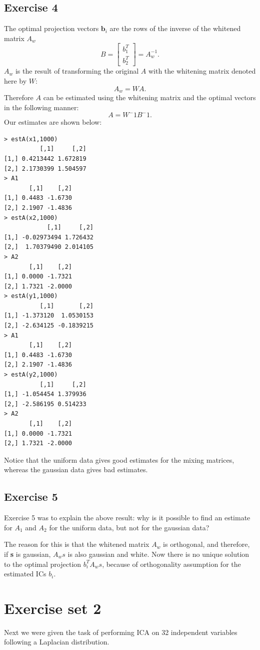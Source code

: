 \documentclass{article}
\begin{document}
\subsection{Exercise 4}
The optimal projection vectors $\textbf{b}_i$ are the rows of the inverse of the
whitened matrix $A_w$
\[
B = \left[ \begin{array}{ccc}
b_1^T  \\
b_2 ^T \end{array} \right] = A_w^{-1}.
\]
$A_w$ is the result of transforming the original $A$ with the
whitening matrix denoted here by $W$:
\[
A_w = WA.
\]
Therefore $A$ can be estimated using the whitening matrix and the optimal
vectors in the following manner:
\[
A = W^-1B^-1.
\]
Our estimates are shown below:
\begin{verbatim}
> estA(x1,1000)
          [,1]     [,2]
[1,] 0.4213442 1.672819
[2,] 2.1730399 1.504597
> A1
       [,1]    [,2]
[1,] 0.4483 -1.6730
[2,] 2.1907 -1.4836
> estA(x2,1000)
            [,1]     [,2]
[1,] -0.02973494 1.726432
[2,]  1.70379490 2.014105
> A2
       [,1]    [,2]
[1,] 0.0000 -1.7321
[2,] 1.7321 -2.0000
> estA(y1,1000)
          [,1]       [,2]
[1,] -1.373120  1.0530153
[2,] -2.634125 -0.1839215
> A1
       [,1]    [,2]
[1,] 0.4483 -1.6730
[2,] 2.1907 -1.4836
> estA(y2,1000)
          [,1]     [,2]
[1,] -1.054454 1.379936
[2,] -2.586195 0.514233
> A2
       [,1]    [,2]
[1,] 0.0000 -1.7321
[2,] 1.7321 -2.0000
\end{verbatim}
Notice that the uniform data gives good estimates for the mixing
matrices, whereas the gaussian data gives bad estimates.
\subsection{Exercise 5}
Exercise 5 was to explain the above result: why is it possible to find
an estimate for $A_1$ and $A_2$ for the uniform data, but not for the
gaussian data?

The reason for this is that the whitened matrix $A_w$ is orthogonal,
and therefore, if \textbf{s} is gaussian, $A_ws$ is also gaussian and
white. Now there is no unique solution to the optimal projection
$b_i^TA_ws$, because of orthogonality assumption for the estimated ICs
$b_i$.

\section{Exercise set 2}
Next we were given the task of performing ICA on 32 independent
variables following a Laplacian distribution.
\end{document}
